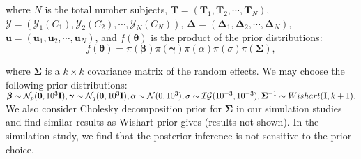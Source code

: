 \noindent where $N$ is the total number subjects, $\boldsymbol{T}=(\boldsymbol{T}_1, \boldsymbol{T}_2, \cdots, \boldsymbol{T}_N)$, $\bm{\mathcal{Y}}=(\mathcal{Y}_{1}(C_1), \mathcal{Y}_{2}(C_2), \cdots, \mathcal{Y}_{N}(C_N))$, $\boldsymbol{\Delta} =(\boldsymbol{\Delta}_1, \boldsymbol{\Delta}_2, \cdots, \boldsymbol{\Delta}_N)$, $\boldsymbol{u}=(\boldsymbol{u}_1, \boldsymbol{u}_2, \cdots, \boldsymbol{u}_N)$, and $f(\boldsymbol{\theta})$ is the product of the prior distributions:
\[f(\boldsymbol{\theta})=\pi(\boldsymbol{\beta})\pi(\boldsymbol{\gamma})\pi(\alpha)\pi(\sigma)\pi(\boldsymbol{\Sigma}),\]

\noindent where $\boldsymbol{\Sigma}$ is a $k\times k$ covariance matrix of the random effects. We may choose the following prior distributions:
$\boldsymbol{\beta} \sim \mathcal{N}_p({\boldsymbol 0}, 10^3{\bf I}), \boldsymbol{\gamma} \sim \mathcal{N}_q({\boldsymbol 0}, 10^3{\bf I}), \alpha\sim \mathcal{N}(0, 10^3), \sigma\sim \mathcal{IG}(10^{-3}, 10^{-3}), \boldsymbol{\Sigma}^{-1}\sim Wishart({\bf I}, k+1). $
We also consider Cholesky decomposition prior for $\boldsymbol{\Sigma}$ in our simulation studies and find similar results as Wishart prior gives (results not shown). In the simulation study, we find that the posterior inference is not sensitive to the prior choice.


